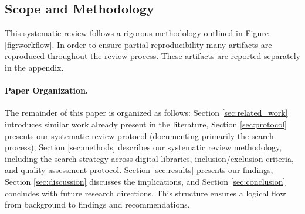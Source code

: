 
\subsection{Scope and Methodology}
This systematic review follows a rigorous methodology outlined in Figure \ref{fig:workflow}. In
order to ensure partial reproducibility many artifacts are reproduced throughout the review
process. These artifacts are reported separately in the appendix.


\paragraph{Paper Organization.}
The remainder of this paper is organized as follows: Section \ref{sec:related_work} introduces
similar work already present in the literature, Section \ref{sec:protocol} presents our systematic
review protocol (documenting primarily the search process), Section \ref{sec:methods} describes our
systematic review methodology, including the search strategy across digital libraries,
inclusion/exclusion criteria, and quality assessment protocol. Section \ref{sec:results} presents
our findings, Section \ref{sec:discussion} discusses the implications, and Section
\ref{sec:conclusion} concludes with future research directions. This structure ensures a logical
flow from background to findings and recommendations. 

